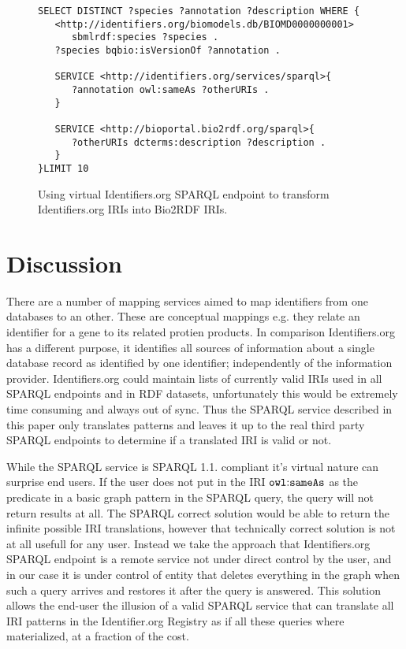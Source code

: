 \documentclass{bioinfo}
\begin{document}
\begin{figure}[h]
{\scriptsize
\begin{verbatim}
SELECT DISTINCT ?species ?annotation ?description WHERE { 
   <http://identifiers.org/biomodels.db/BIOMD0000000001> 
      sbmlrdf:species ?species . 
   ?species bqbio:isVersionOf ?annotation .

   SERVICE <http://identifiers.org/services/sparql>{
      ?annotation owl:sameAs ?otherURIs .
   }

   SERVICE <http://bioportal.bio2rdf.org/sparql>{
      ?otherURIs dcterms:description ?description .
   }        
}LIMIT 10
\end{verbatim}
}
  \caption{Using virtual Identifiers.org SPARQL endpoint to transform Identifiers.org IRIs into Bio2RDF IRIs.}
  \label{translatestuff}
\end{figure}

\section{Discussion}
There are a number of mapping services aimed to map identifiers from one databases to an other.
These are conceptual mappings e.g. they relate an identifier for a gene to its related protien products.
In comparison Identifiers.org has a different purpose, it identifies all sources of information about a single database record as identified by one identifier; independently of the information provider.
Identifiers.org could maintain lists of currently valid IRIs used in all SPARQL endpoints and in RDF datasets,
unfortunately this would be extremely time consuming and always out of sync.
Thus the SPARQL service described in this paper only translates patterns and leaves it up to the real third party SPARQL endpoints to determine if a translated IRI is valid or not.

While the SPARQL service is SPARQL 1.1. compliant it's virtual nature can surprise end users.
If the user does not put in the IRI $\mathtt{owl\text{\rm :}{}sameAs}$ as the predicate in a basic graph pattern in the SPARQL query, the query will not return results at all.
The SPARQL correct solution would be able to return the infinite possible IRI translations,
however that technically correct solution is not at all usefull for any user.
Instead we take the approach that Identifiers.org SPARQL endpoint is a remote service not under direct control by the user,
and in our case it is under control of entity that deletes everything in the graph when such a query arrives and restores it after the query is answered.
This solution allows the end-user the illusion of a valid SPARQL service that can translate all IRI patterns in the Identifier.org Registry as if all these
queries where materialized, at a fraction of the cost.
\end{document}
